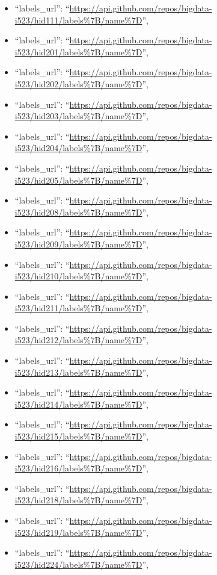 \begin{itemize}
\item
  ``labels\_url'':
  ``\url{https://api.github.com/repos/bigdata-i523/hid111/labels\%7B/name\%7D}'',
\item
  ``labels\_url'':
  ``\url{https://api.github.com/repos/bigdata-i523/hid201/labels\%7B/name\%7D}'',
\item
  ``labels\_url'':
  ``\url{https://api.github.com/repos/bigdata-i523/hid202/labels\%7B/name\%7D}'',
\item
  ``labels\_url'':
  ``\url{https://api.github.com/repos/bigdata-i523/hid203/labels\%7B/name\%7D}'',
\item
  ``labels\_url'':
  ``\url{https://api.github.com/repos/bigdata-i523/hid204/labels\%7B/name\%7D}'',
\item
  ``labels\_url'':
  ``\url{https://api.github.com/repos/bigdata-i523/hid205/labels\%7B/name\%7D}'',
\item
  ``labels\_url'':
  ``\url{https://api.github.com/repos/bigdata-i523/hid208/labels\%7B/name\%7D}'',
\item
  ``labels\_url'':
  ``\url{https://api.github.com/repos/bigdata-i523/hid209/labels\%7B/name\%7D}'',
\item
  ``labels\_url'':
  ``\url{https://api.github.com/repos/bigdata-i523/hid210/labels\%7B/name\%7D}'',
\item
  ``labels\_url'':
  ``\url{https://api.github.com/repos/bigdata-i523/hid211/labels\%7B/name\%7D}'',
\item
  ``labels\_url'':
  ``\url{https://api.github.com/repos/bigdata-i523/hid212/labels\%7B/name\%7D}'',
\item
  ``labels\_url'':
  ``\url{https://api.github.com/repos/bigdata-i523/hid213/labels\%7B/name\%7D}'',
\item
  ``labels\_url'':
  ``\url{https://api.github.com/repos/bigdata-i523/hid214/labels\%7B/name\%7D}'',
\item
  ``labels\_url'':
  ``\url{https://api.github.com/repos/bigdata-i523/hid215/labels\%7B/name\%7D}'',
\item
  ``labels\_url'':
  ``\url{https://api.github.com/repos/bigdata-i523/hid216/labels\%7B/name\%7D}'',
\item
  ``labels\_url'':
  ``\url{https://api.github.com/repos/bigdata-i523/hid218/labels\%7B/name\%7D}'',
\item
  ``labels\_url'':
  ``\url{https://api.github.com/repos/bigdata-i523/hid219/labels\%7B/name\%7D}'',
\item
  ``labels\_url'':
  ``\url{https://api.github.com/repos/bigdata-i523/hid224/labels\%7B/name\%7D}'',

\end{itemize}
